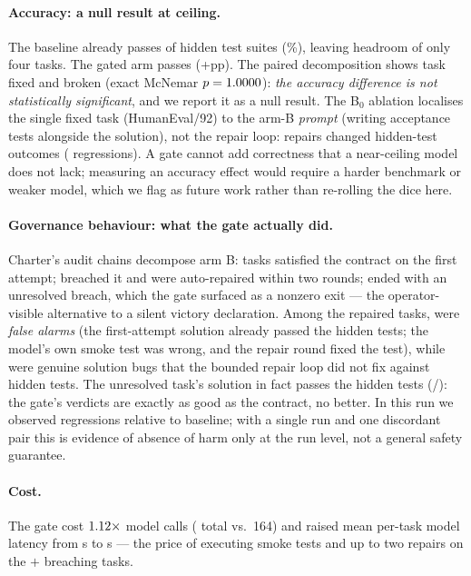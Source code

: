 \documentclass{article}
\begin{document}
\paragraph{Accuracy: a null result at ceiling.} The baseline already passes
\numpassA{} of \numntasks{} hidden test suites (\numpAa\%), leaving headroom of only
four tasks. The gated arm passes \numpassB{} (+\numdeltapp{}pp). The paired
decomposition shows \numbfixed{} task fixed and \numbbroke{} broken (exact McNemar
$p=1.0000$): \emph{the accuracy difference is not statistically significant},
and we report it as a null result. The B$_0$ ablation localises the single fixed task
(HumanEval/92) to the arm-B \emph{prompt} (writing acceptance tests alongside the
solution), not the repair loop: repairs changed \numrepairfixedhidden{} hidden-test
outcomes (\numrepairbrokehidden{} regressions). A gate cannot add correctness that a
near-ceiling model does not lack; measuring an accuracy effect would require a harder
benchmark or weaker model, which we flag as future work rather than re-rolling the
dice here.

\paragraph{Governance behaviour: what the gate actually did.} Charter's audit chains
decompose arm B: \numfirstpassB{} tasks satisfied the contract on the first attempt;
\numrepairedB{} breached it and were auto-repaired within two rounds;
\numunresolvedB{} ended with an unresolved breach, which the gate surfaced as a
nonzero exit --- the operator-visible alternative to a silent victory declaration.
Among the \numrepairedB{} repaired tasks, \numrepairedfalsealarm{} were
\emph{false alarms} (the first-attempt solution already passed the hidden tests; the
model's own smoke test was wrong, and the repair round fixed the test), while
\numrepairedtruebug{} were genuine solution bugs that the bounded repair loop did not
fix against hidden tests. The unresolved task's solution in fact passes the hidden
tests (\numunresolvedhiddenpass/\numunresolvedB): the gate's verdicts are exactly as
good as the contract, no better. In this run we observed \numbbroke{} regressions
relative to baseline; with a single run and one discordant pair this is evidence of
absence of harm only at the run level, not a general safety guarantee.

\paragraph{Cost.} The gate cost $1.12\times$ model calls
(\numtotalcallsB{} total vs.\ 164) and raised mean per-task model latency from
\nummeansecsA{}s to \nummeansecsB{}s --- the price of executing smoke tests and up to
two repairs on the \numrepairedB$+$\numunresolvedB{} breaching tasks.
\end{document}

